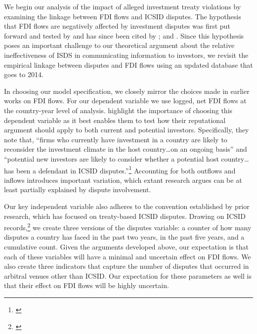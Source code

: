 \documentclass[12pt,onesided]{amsart}
\begin{document}
We begin our analysis of the impact of alleged investment treaty violations by examining the linkage between FDI flows and ICSID disputes. The hypothesis that FDI flows are negatively affected by investment disputes was first put forward and tested by \citet{allee:peinhardt:2011} and has since been cited by \citet{berger2011more,poulsen2013claim,wellhausen2013,haftel2013delayed}; and \citet{kerner2014}. Since this hypothesis poses an important challenge to our theoretical argument about the relative ineffectiveness of ISDS in communicating information to investors, we revisit the empirical linkage between disputes and FDI flows using an updated database that goes to 2014.

In choosing our model specification, we closely mirror the choices made in earlier works on FDI flows. For our dependent variable we use logged, net FDI flows at the country-year level of analysis. \citeauthor{allee:peinhardt:2011} highlight the importance of choosing this dependent variable as it best enables them to test how their reputational argument should apply to both current and potential investors. Specifically, they note that, ``firms who currently have investment in a country are likely to reconsider the investment climate in the host country\ldots on an ongoing basis'' and ``potential new investors are likely to consider whether a potential host country\ldots has been a defendant in ICSID disputes.''\footnote{\citet[p. 419--420]{allee:peinhardt:2011}} Accounting for both outflows and inflows introduces important variation, which extant research argues can be at least partially explained by dispute involvement. 

\nocite{icsid:2014}
Our key independent variable also adheres to the convention established by prior research, which has focused on treaty-based ICSID disputes. Drawing on ICSID records,\footnote{\citet[p. 7, 10]{icsid:2015}} we create three versions of the disputes variable: a counter of how many disputes a country has faced in the past two years, in the past five years, and a cumulative count. Given the arguments developed above, our expectation is that each of these variables will have a minimal and uncertain effect on FDI flows. We also create three indicators that capture the number of disputes that occurred in arbitral venues other than ICSID. Our expectation for these parameters as well is that their effect on FDI flows will be highly uncertain.
\end{document}
